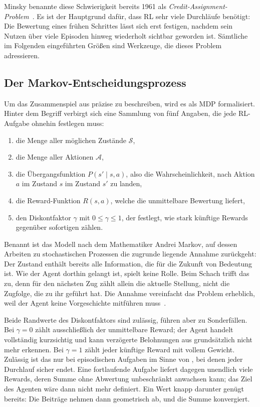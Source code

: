 Minsky benannte diese Schwierigkeit bereits 1961 als
\emph{Credit-Assignment-Problem}~\cite{minsky1961}. Es ist der Hauptgrund
dafür, dass \ac{RL} sehr viele Durchläufe benötigt: Die Bewertung eines frühen
Schrittes lässt sich erst festigen, nachdem sein Nutzen über viele Episoden
hinweg wiederholt sichtbar geworden ist. Sämtliche im Folgenden eingeführten
Größen sind Werkzeuge, die dieses Problem adressieren.

\subsection{Der Markov-Entscheidungsprozess}
\label{sec:mdp}

Um das Zusammenspiel aus  präzise zu beschreiben, wird
es als \ac{MDP} formalisiert. Hinter dem Begriff verbirgt sich eine Sammlung von
fünf Angaben, die jede \ac{RL}-Aufgabe ohnehin festlegen muss:

\begin{enumerate}
  \item die Menge aller möglichen Zustände $\mathcal{S}$,
  \item die Menge aller Aktionen $\mathcal{A}$,
  \item die Übergangsfunktion $P(s' \mid s, a)$, also die Wahrscheinlichkeit,
        nach Aktion $a$ im Zustand $s$ im Zustand $s'$ zu landen,
  \item die Reward-Funktion $R(s, a)$, welche die unmittelbare Bewertung
        liefert,
  \item den Diskontfaktor $\gamma$ mit $0 \le \gamma \le 1$, der festlegt, wie
        stark künftige Rewards gegenüber sofortigen zählen.
\end{enumerate}

Benannt ist das Modell nach dem Mathematiker Andrei Markov, auf dessen Arbeiten
zu stochastischen Prozessen die zugrunde liegende Annahme zurückgeht: Der
Zustand enthält bereits alle Information, die für die Zukunft von Bedeutung ist.
Wie der Agent dorthin gelangt ist, spielt keine Rolle. Beim Schach trifft das
zu, denn für den nächsten Zug zählt allein die aktuelle Stellung, nicht die
Zugfolge, die zu ihr geführt hat. Die Annahme vereinfacht das Problem erheblich,
weil der Agent keine Vorgeschichte mitführen
muss~\cite[Abschn.~3.1]{suttonbarto2018}.

Beide Randwerte des Diskontfaktors sind zulässig, führen aber zu Sonderfällen.
Bei $\gamma = 0$ zählt ausschließlich der unmittelbare Reward; der Agent handelt
vollständig kurzsichtig und kann verzögerte Belohnungen aus 
grundsätzlich nicht mehr erkennen. Bei $\gamma = 1$ zählt jeder künftige Reward
mit vollem Gewicht. Zulässig ist das nur bei episodischen Aufgaben im Sinne von
, bei denen jeder Durchlauf sicher endet. Eine
fortlaufende Aufgabe liefert dagegen unendlich viele Rewards, deren Summe ohne
Abwertung unbeschränkt anwachsen kann; das Ziel des Agenten wäre dann nicht mehr
definiert. Ein Wert knapp darunter genügt bereits: Die Beiträge nehmen dann
geometrisch ab, und die Summe konvergiert. 

